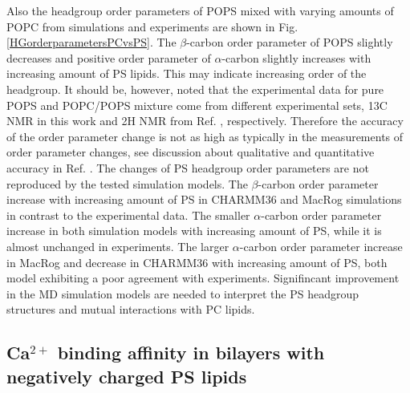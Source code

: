 \documentclass[aps,prl,superscriptaddress,twocolumn]{revtex4}
\begin{document}
Also the headgroup order parameters of POPS mixed with varying amounts of POPC
from simulations and experiments \cite{borle85,roux90} are shown in Fig. \ref{HGorderparametersPCvsPS}.
The $\beta$-carbon order parameter of POPS slightly decreases and positive 
order parameter of $\alpha$-carbon slightly increases with increasing
amount of PS lipids. This may indicate increasing order of the headgroup.
It should be, however, noted that the experimental data for pure POPS and
POPC/POPS mixture come from different experimental sets, 13C NMR in this work
and 2H NMR from Ref. , respectively. Therefore the accuracy
of the order parameter change is not as high as typically in the measurements
of order parameter changes, see discussion about qualitative and quantitative 
accuracy in Ref. . The changes of PS headgroup order parameters
are not reproduced by the tested simulation models. The $\beta$-carbon order parameter
increase with increasing amount of PS in CHARMM36 and MacRog simulations in contrast
to the experimental data. The smaller $\alpha$-carbon order parameter increase in both
simulation models with increasing amount of PS, while it is almost unchanged in experiments.
The larger $\alpha$-carbon order parameter increase in MacRog and decrease in CHARMM36
with increasing amount of PS, both model exhibiting a poor agreement with experiments. 
Signifincant improvement in the MD simulation models are needed to interpret the
PS headgroup structures and mutual interactions with PC lipids. 

\subsection{Ca$^{2+}$ binding affinity in bilayers with negatively charged PS lipids}
\end{document}
